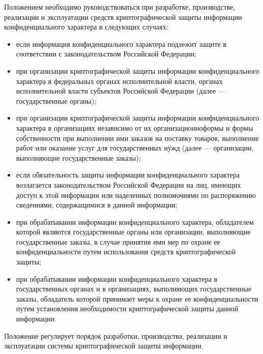 \vspace{\baselineskip}
Положением необходимо руководствоваться при разработке, производстве, реализации и эксплуатации средств криптографической защиты информации конфиденциального характера в следующих случаях:
\begin{itemize}
	\item если информация конфиденциального характера подлежит защите в соответствии с законодательством Российской Федерации;
	\item при организации криптографической защиты информации конфиденциального характера в федеральных органах исполнительной власти, органах исполнительной власти субъектов Российской Федерации (далее --- государственные органы);
	\item при организации криптографической защиты информации конфиденциального характера в организациях независимо от их организационно формы и формы собственности при выполнении ими заказов на поставку товаров, выполнение работ или оказание услуг для государственных нужд (далее --- организации, выполняющие государственные заказы);
	\item если обязательность защиты информации конфиденциального характера возлагается законодательством Российской Федерации на лиц, имеющих доступ к этой информации или наделенных полномочиями по распоряжению сведениями, содержащимися в данной информации;
	\item при обрабатывании информации конфиденциального характера, обладателем которой являются государственные органы или организации, выполняющие государственные заказы, в случае принятия ими мер по охране ее конфиденциальности путем использования средств криптографической защиты;
	\item при обрабатывании информации конфиденциального характера в государственных органах и в организациях, выполняющих государственные заказы, обладатель которой принимает меры к охране ее конфиденциальности путем установления необходимости криптографической защиты данной информации.
\end{itemize}

Положение регулирует порядок разработки, производства, реализации и эксплуатации системы криптографической защиты информации.

